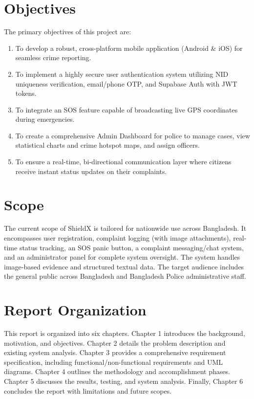 \documentclass[12pt, a4paper, twoside, openany]{report}
\begin{document}
\section{Objectives}
The primary objectives of this project are:
\begin{enumerate}
    \item To develop a robust, cross-platform mobile application (Android \& iOS) for seamless crime reporting.
    \item To implement a highly secure user authentication system utilizing NID uniqueness verification, email/phone OTP, and Supabase Auth with JWT tokens.
    \item To integrate an SOS feature capable of broadcasting live GPS coordinates during emergencies.
    \item To create a comprehensive Admin Dashboard for police to manage cases, view statistical charts and crime hotspot maps, and assign officers.
    \item To ensure a real-time, bi-directional communication layer where citizens receive instant status updates on their complaints.
\end{enumerate}
\section{Scope}
The current scope of ShieldX is tailored for nationwide use across Bangladesh. It encompasses user registration, complaint logging (with image attachments), real-time status tracking, an SOS panic button, a complaint messaging/chat system, and an administrator panel for complete system oversight. The system handles image-based evidence and structured textual data. The target audience includes the general public across Bangladesh and Bangladesh Police administrative staff.
\section{Report Organization}
This report is organized into six chapters. Chapter 1 introduces the background, motivation, and objectives. Chapter 2 details the problem description and existing system analysis. Chapter 3 provides a comprehensive requirement specification, including functional/non-functional requirements and UML diagrams. Chapter 4 outlines the methodology and accomplishment phases. Chapter 5 discusses the results, testing, and system analysis. Finally, Chapter 6 concludes the report with limitations and future scopes.
\end{document}
